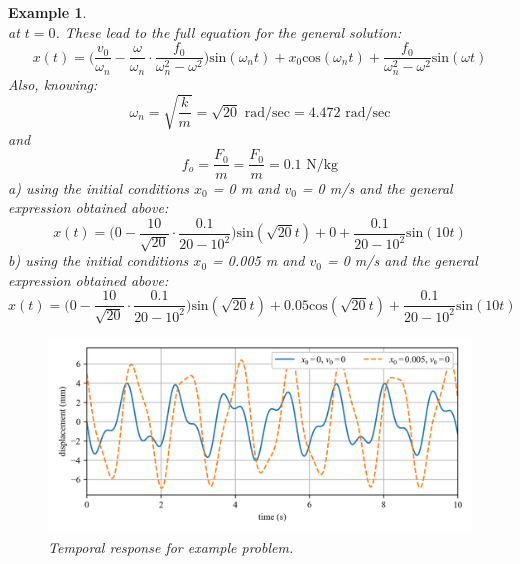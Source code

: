 \documentclass[12pt,letter]{article}
\newtheorem{ex}{Example}
\numberwithin{ex}{section} %
\newenvironment{example}{\begin{mdframed}[middlelinewidth=0.5mm]\begin{ex}\normalfont}{\end{ex}\end{mdframed}}
\numberwithin{re}{section} %
\numberwithin{vcs}{section} %
\begin{document}
\begin{example}
\begin{equation}
			\end{equation}	
			at $t=0$. These lead to the full equation for the general solution:
			\begin{equation}
				x(t) = \Big(\frac{v_0}{\omega_n}-\frac{\omega}{\omega_n}\cdot \frac{f_0}{\omega_n^2-\omega^2}\Big)\text{sin}(\omega_n t) + x_0\text{cos}(\omega_n t) + \frac{f_0}{\omega_n^2-\omega^2}\text{sin}(\omega t)
			\end{equation}								
			Also, knowing:
			\begin{equation}
				\omega_n = \sqrt{\frac{k}{m}} = \sqrt{20} \text{ rad/sec} =  4.472 \text{ rad/sec}
			\end{equation}				
			and
			\begin{equation}
				f_o = \frac{F_0}{m} = \frac{F_0}{m} = 0.1 \text{ N/kg}
			\end{equation}	
			a) using the initial conditions $x_0$ = 0 m and $v_0$ = 0 m/s and the general expression obtained above:
			\begin{equation}
				x(t) = \Big(0-\frac{10}{\sqrt{20}}\cdot \frac{0.1}{20-10^2}\Big)\text{sin}(\sqrt{20} t) + 0 + \frac{0.1}{20-10^2}\text{sin}(10 t)
			\end{equation}			
			b) using the initial conditions $x_0$ = 0.005 m and $v_0$ = 0 m/s and the general expression obtained above:
			\begin{equation}
				x(t) = \Big(0-\frac{10}{\sqrt{20}}\cdot \frac{0.1}{20-10^2}\Big)\text{sin}(\sqrt{20} t) + 0.05\text{cos}(\sqrt{20} t) + \frac{0.1}{20-10^2}\text{sin}(10 t)
			\end{equation}			
			\begin{figure}[H]
				\centering
				\includegraphics[width=1.0\textwidth]{../figures/response_1-DOF-spring_mass_forced.png}
				\caption{Temporal response for example problem.}
			\end{figure}
\end{example}
\end{document}
